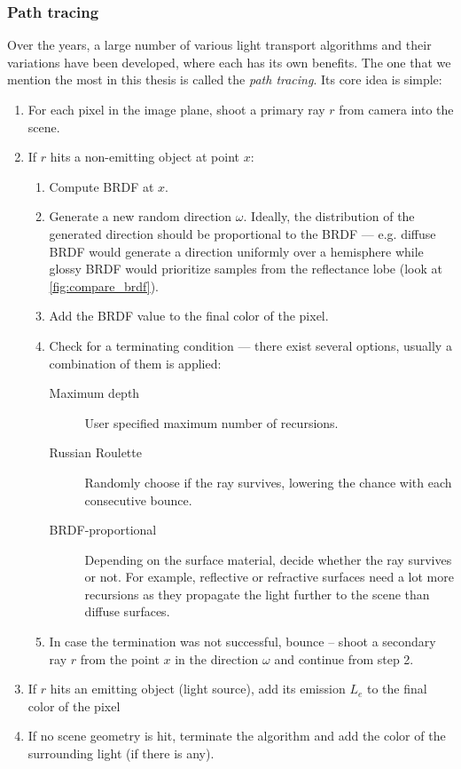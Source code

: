 \subsubsection{Path tracing}
Over the years, a large number of various light transport algorithms and their variations have been developed, where each has its own benefits. The one that we mention the most in this thesis is called the \emph{path tracing}. Its core idea is simple:

\renewcommand{\labelenumii}{\theenumii}
\renewcommand{\theenumii}{\theenumi.\arabic{enumii}.}
\begin{enumerate}
	\item For each pixel in the image plane, shoot a primary ray $r$ from camera into the scene.
	\item If $r$ hits a non-emitting object at point $x$:
	\begin{enumerate}
		\item Compute BRDF at $x$.
		\item Generate a new random direction $\omega$. Ideally, the distribution of the generated direction should be proportional to the BRDF --- e.g. diffuse BRDF would generate a direction  uniformly over a hemisphere while glossy BRDF would prioritize samples from the reflectance lobe (look at \autoref{fig:compare_brdf}).
		\item Add the BRDF value to the final color of the pixel.
		\item Check for a terminating condition --- there exist several options, usually a combination of them is applied:
			\begin{description}
				\item [Maximum depth] User specified maximum number of recursions.
				\item [Russian Roulette] Randomly choose if the ray survives, lowering the chance with each consecutive bounce.
				\item [BRDF-proportional] Depending on the surface material, decide whether the ray survives or not. For example, reflective or refractive surfaces need a lot more recursions as they propagate the light further to the scene than diffuse surfaces.
			\end{description}
		\item In case the termination was not successful, bounce -- shoot a secondary ray $r$ from the point $x$ in the direction $\omega$ and continue from step 2.
	\end{enumerate}
	\item If $r$ hits an emitting object (light source), add its emission $L_e$ to the final color of the pixel
	\item If no scene geometry is hit, terminate the algorithm and add the color of the surrounding light (if there is any).
\end{enumerate}

